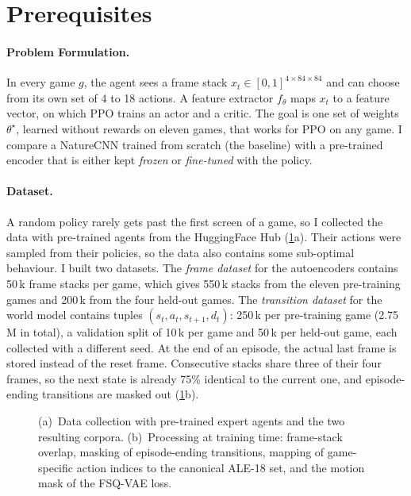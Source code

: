 \documentclass[runningheads]{llncs}
\begin{document}
\section{Prerequisites}
\label{sec:prereq}

\paragraph{Problem Formulation.} In every game $g$, the agent sees a frame stack
$x_t\in[0,1]^{4\times84\times84}$ and can choose from its own set of 4 to 18 actions. A feature
extractor $f_\theta$ maps $x_t$ to a feature vector, on which PPO trains an actor and a critic.
The goal is one set of weights $\theta^\star$, learned without rewards on eleven games, that
works for PPO on any game. I compare a NatureCNN trained from scratch (the baseline) with a
pre-trained encoder that is either kept \emph{frozen} or \emph{fine-tuned} with the policy.

\paragraph{Dataset.} A random policy rarely gets past the first screen of a game, so I
collected the data with pre-trained agents from the HuggingFace Hub (\cref{fig:data}a). Their actions were sampled from their policies, so the data also contains some sub-optimal
behaviour. I built two datasets. The \emph{frame dataset} for the
autoencoders contains 50\,k frame stacks per game, which gives 550\,k stacks from the eleven
pre-training games and 200\,k from the four held-out games. The \emph{transition dataset} for
the world model contains tuples $(s_t,a_t,s_{t+1},d_t)$: 250\,k per pre-training game (2.75\,M in
total), a validation split of 10\,k per game and 50\,k per held-out game, each collected with a
different seed. At the end of an episode, the actual last frame is stored instead of the reset frame.
Consecutive stacks share three of their four frames, so the next state is already 75\%
identical to the current one, and episode-ending transitions are masked out (\cref{fig:data}b).

\begin{figure}[t]
\centering

\caption{(a)~Data collection with pre-trained expert agents and the two resulting corpora.
(b)~Processing at training time: frame-stack overlap, masking of episode-ending
transitions, mapping of game-specific action indices to the canonical ALE-18 set, and the
motion mask of the FSQ-VAE loss.}
\label{fig:data}
\end{figure}
\end{document}
